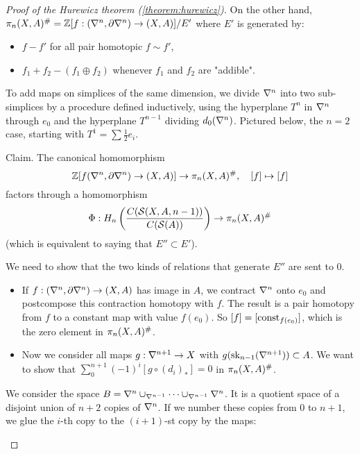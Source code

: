 \begin{proof}[Proof of the Hurewicz theorem (\ref{theorem:hurewicz})]
On the other hand, $\pi_n(X,A)^\#={\mathbb Z}[f:(\nabla^n,\partial\nabla^n)\to(X,A)]/E'$
where $E'$ is generated by:
\begin{itemize}[label={-}]
    \item $f-f'$ for all pair homotopic $f\sim f'$,
    \item $f_1+f_2-(f_1\oplus f_2)$ whenever $f_1$ and $f_2$ are "addible".
\end{itemize}

To add maps on simplices of the same dimension, we divide $\nabla^n$ into two sub-simplices by a procedure defined inductively, using the hyperplane $T^n$ in $\nabla^n$ through $e_0$ and the hyperplane $T^{n-1}$ dividing $d_0(\nabla^{n})$. Pictured below, the $n=2$ case, starting with $T^1=\sum \frac{1}{2} e_i$.


Claim. The canonical homomorphism
\[{\mathbb Z}[f(\nabla^n,\partial\nabla^n)\to(X,A)]\to \pi_n(X,A)^\#,\quad [f]\mapsto[f]\]
factors through a homomorphism
\[\Phi: H_n\left(\frac{C(\mathcal{S}(X,A,n-1))}{C(\mathcal{S}(A))}\right)\to\pi_n(X,A)^\#\]
(which is equivalent to saying that $E''\subset E'$).

\begin{claimproof}
We need to show that the two kinds of relations that generate $E''$ are sent to $0$.
\begin{itemize}[label={-}]
    \item If $f:(\nabla^n,\partial\nabla^n)\to(X,A)$ has image in $A$, we contract $\nabla^n$ onto $e_0$ and postcompose this contraction homotopy with $f$. The result is a pair homotopy from $f$ to a constant map with value $f(e_0)$. So $[f]=[\operatorname{const}_{f(e_0)}]$, which is the zero element in $\pi_n(X,A)^\#$.
    \item Now we consider all maps $g:\nabla^{n+1}\to X$ with $g(\operatorname{sk}_{n-1}(\nabla^{n+1}))\subset A$. We want to show that $\sum_0^{n+1}(-1)^i [g\circ(d_i)_*]=0$ in $\pi_n(X,A)^\#$.
\end{itemize}

We consider the space $B=\nabla^{n}\cup_{\nabla^{n-1}}\dots\cup_{\nabla^{n-1}}\nabla^{n}$. It is a quotient space of a disjoint union of $n+2$ copies of $\nabla^n$. If we number these copies from $0$ to $n+1$, we glue the $i$-th copy to the $(i+1)$-st copy by the maps:
\begin{center}
\end{center}


\end{claimproof}
\end{proof}
